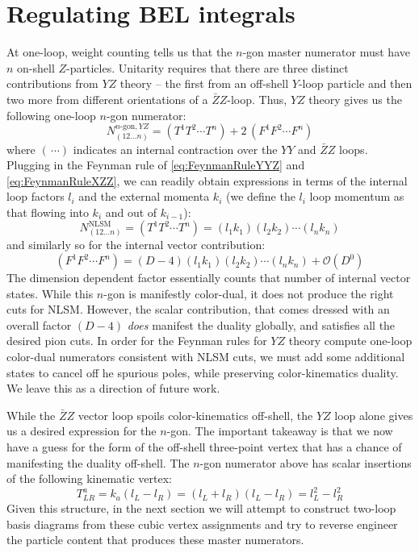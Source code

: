 \documentclass[11pt,letter]{article}
\def\be{\begin{equation}}
\def\ee{\end{equation}}
\begin{document}
\section{Regulating BEL integrals}
At one-loop, weight counting tells us that the $n$-gon master numerator must have $n$ on-shell $Z$-particles. Unitarity requires that there are three distinct contributions from $Y\!Z$ theory -- the first from an off-shell $Y$-loop particle and then two more from different orientations of a $\bar{Z}Z$-loop.  Thus, $Y\!Z$ theory gives us the following one-loop $n$-gon numerator:
\be
N^{n\text{-gon},YZ}_{(12...n)} = (T^{1}T^{2}\cdots T^{n})+2\, (F^1F^2\cdots F^n)
\ee
where $(\,\cdots)$ indicates an internal contraction over the $YY$ and $\bar{Z}Z$ loops. Plugging in the Feynman rule of \cref{eq:FeynmanRuleYYZ} and \cref{eq:FeynmanRuleXZZ}, we can readily obtain expressions in terms of the internal loop factors $l_i$ and the external momenta $k_i$ (we define the $l_i$ loop momentum as that flowing into $k_i$ and out of $k_{i-1}$):
\be
N_{(12...n)}^{\text{NLSM}}=(T^{1}T^{2}\cdots T^{n}) = (l_1 k_1)(l_2 k_2) \cdots (l_n k_n)
\ee
and similarly so for the internal vector contribution:
\be
 (F^1F^2\cdots F^n) = (D-4)(l_1 k_1)(l_2 k_2) \cdots (l_n k_n) + \mathcal{O}(D^0)
\ee
The dimension dependent factor essentially counts that number of internal vector states. While this $n$-gon is manifestly color-dual, it does not produce the right cuts for NLSM. However, the scalar contribution, that comes dressed with an overall factor $(D-4)$ \textit{does} manifest the duality globally, and satisfies all the desired pion cuts. In order for the Feynman rules for $Y\!Z$ theory compute one-loop color-dual numerators consistent with NLSM cuts, we must add some additional states to cancel off he spurious poles, while preserving color-kinematics duality. We leave this as a direction of future work. 

While the $\bar{Z}Z$ vector loop spoils color-kinematics off-shell, the $Y\!Z$ loop alone gives us a desired expression for the $n$-gon. The important takeaway is that we now have a guess for the form of the off-shell three-point vertex that has a chance of manifesting the duality off-shell. The $n$-gon numerator above has scalar insertions of the following kinematic vertex:
\be
T^{a}_{LR} = k_a(l_L-l_{R}) = (l_L+l_{R}) (l_L-l_{R})  = l_L^2-l_{R}^2 
\ee
Given this structure, in the next section we will attempt to construct two-loop basis diagrams from these cubic vertex assignments and try to reverse engineer the particle content that produces these master numerators.
\end{document}
